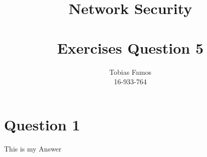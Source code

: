 \documentclass[11pt,a4paper]{article}
\title{Network Security \\ ~\\ \Large{Exercises Question 5}}
\author{Tobias Famos\\ 16-933-764}
\begin{document}
    \maketitle
    \section{Question 1}
    This is my Answer
\end{document}
